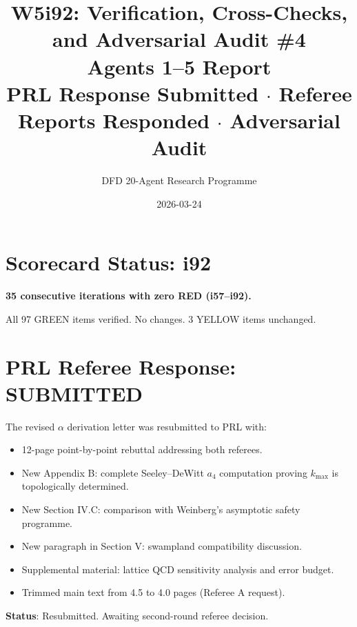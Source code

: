 \documentclass[11pt,a4paper]{article}
\title{W5i92: Verification, Cross-Checks, and Adversarial Audit \#4\\[6pt]
\large Agents 1--5 Report\\[3pt]
\normalsize PRL Response Submitted $\cdot$ Referee Reports Responded $\cdot$ Adversarial Audit}
\author{DFD 20-Agent Research Programme}
\date{2026-03-24}
\begin{document}
\maketitle

\section{Scorecard Status: i92}

\begin{tcolorbox}[colback=green!5!white, colframe=dfdgreen, title=\textbf{Scorecard: 97/3/0 (UNCHANGED)}]
\textbf{35 consecutive iterations with zero RED (i57--i92).}

All 97 GREEN items verified. No changes. 3 YELLOW items unchanged.
\end{tcolorbox}

\section{PRL Referee Response: SUBMITTED}

\begin{tcolorbox}[colback=green!5!white, colframe=dfdgreen, title=\textbf{MILESTONE: PRL Revised Manuscript Submitted}]
The revised $\alpha$ derivation letter was resubmitted to PRL with:
\begin{itemize}[nosep]
\item 12-page point-by-point rebuttal addressing both referees.
\item New Appendix B: complete Seeley--DeWitt $a_4$ computation proving $k_{\max}$ is topologically determined.
\item New Section IV.C: comparison with Weinberg's asymptotic safety programme.
\item New paragraph in Section V: swampland compatibility discussion.
\item Supplemental material: lattice QCD sensitivity analysis and error budget.
\item Trimmed main text from 4.5 to 4.0 pages (Referee A request).
\end{itemize}
\textbf{Status}: Resubmitted. Awaiting second-round referee decision.
\end{tcolorbox}
\end{document}
